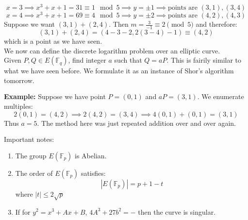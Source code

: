 \documentclass{article}
\begin{document}
$$x = 3 \implies x^3 + x + 1 = 31 \equiv 1 \mod 5 \implies y = \pm 1 \implies \text{points are }(3,1), (3,4)$$
$$x = 4 \implies x^3 + x + 1 = 69 \equiv 4 \mod 5 \implies y = \pm 2 \implies \text{points are }(4,2), (4,3)$$
Suppose we want $(3,1) + (2,4)$. Then $m= \frac{3}{-1} \equiv 2 \pmod 5$ and therefore:
$$(3,1) + (2,4) = (4-3-2, 2(3-4) - 1) \equiv (4,2)$$
which is a point as we have seen.\\
We now can define the discrete logarithm problem over an elliptic curve.\\ Given $P, Q \in E(\mathbb{F}_q)$, find integer $a$ such that $Q = aP$. This is fairily similar to what we have seen before. We formulate it as an instance of Shor's algorithm tomorrow.\\
\begin{tcolorbox}\textbf{Example:}
	Suppose we have point $P = (0,1)$ and $aP = (3,1)$. We enumerate multiples:
	$$2(0,1) = (4,2) \implies 2(4,2) = (3,4) \implies 4(0,1) + (0,1) = (3,1)$$
	Thus $a = 5$. The method here was just repeated addition over and over again.
\end{tcolorbox}
Important notes:
\begin{enumerate}
	\item The group $E(\mathbb{F}_p)$ is Abelian.
	\item The order of $E(\mathbb{F}_p)$ satisfies:
		$$|E(\mathbb{F}_p)| = p + 1 - t$$
		where $|t| \leq 2\sqrt{p}$
	\item If for $y^2 = x^3 + Ax + B$, $4A^3 + 27b^2 = -$ then the curve is singular.
\end{enumerate}
\end{document}
